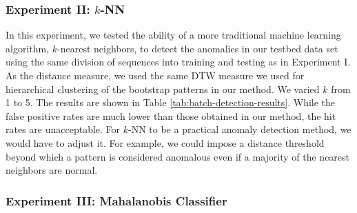 \subsubsection{Experiment II: $k$-NN}

In this experiment, we tested the ability of a more traditional
machine learning algorithm, $k$-nearest neighbors, to detect the
anomalies in our testbed data set using the same division of sequences
into training and testing as in Experiment I.  As the distance
measure, we used the same DTW measure we used for hierarchical
clustering of the bootstrap patterns in our method.  We varied $k$
from 1 to 5.  The results are shown in
Table \ref{tab:batch-detection-results}. While the false positive rates are much
lower than those obtained in our method, the hit rates are
unacceptable.  For $k$-NN to be a practical anomaly detection method,
we would have to adjust it.  For example, we could impose a distance
threshold beyond which a pattern is considered anomalous even if a
majority of the nearest neighbors are normal.


\subsubsection{Experiment III: Mahalanobis Classifier}

